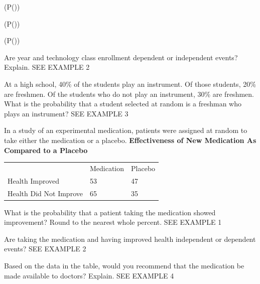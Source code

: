 \documentclass{article}
\newenvironment{practice}[2]{}{}        %
\newcommand{\answer}[1]{}               %
\newcommand{\te}[1]{}                   %
\begin{document}
\begin{practice}{15}{1}
(P(\mid{}))
\answer{about 0.52 or 52\%}
\end{practice}
\begin{practice}{16}{1}
(P(\mid{}))
\answer{about 0.53 or 53\%}
\end{practice}
\begin{practice}{17}{1}
(P(\mid{}))
\answer{0.45 or 45\%}
\end{practice}
\begin{practice}{18}{2}
Are year and technology class enrollment dependent or independent events? Explain. SEE EXAMPLE 2
\answer{Dependent; (P(\text{Game Design}\mid\text{Sophomore})\approx53\%) and (P(\text{Game Design})=50\%), so (P(\text{Game Design}\mid\text{Sophomore})\neq P(\text{Game Design})).}
\te{Answer printed on next page.}
\end{practice}
\begin{practice}{19}{2}
At a high school, 40\% of the students play an instrument. Of those students, 20\% are freshmen. Of the students who do not play an instrument, 30\% are freshmen. What is the probability that a student selected at random is a freshman who plays an instrument? SEE EXAMPLE 3
\answer{0.08 or 8\%}
\end{practice}
\begin{practice}{20}{1}
In a study of an experimental medication, patients were assigned at random to take either the medication or a placebo.
\textbf{Effectiveness of New Medication As Compared to a Placebo}
\begin{tabular}{lll}
 & Medication & Placebo \\
Health Improved & 53 & 47 \\
Health Did Not Improve & 65 & 35 \\
\end{tabular}
What is the probability that a patient taking the medication showed improvement? Round to the nearest whole percent. SEE EXAMPLE 1
\answer{45\%}
\end{practice}
\begin{practice}{21}{2}
Are taking the medication and having improved health independent or dependent events? SEE EXAMPLE 2
\answer{dependent}
\end{practice}
\begin{practice}{22}{3}
Based on the data in the table, would you recommend that the medication be made available to doctors? Explain. SEE EXAMPLE 4
\answer{No; (P(\text{improved}\mid\text{medication})\approx45\%) while (P(\text{improved}\mid\text{placebo})\approx57\%). Patients taking the medication showed improvement less frequently than patients taking the placebo.}
\te{Answer printed on next page.}
\end{practice}
\end{document}
